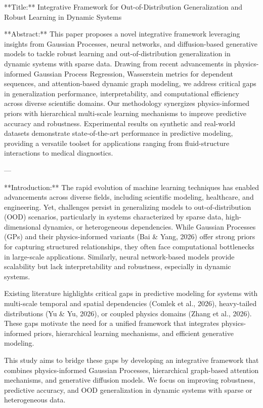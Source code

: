 **Title:**  
Integrative Framework for Out-of-Distribution Generalization and Robust Learning in Dynamic Systems  

**Abstract:**  
This paper proposes a novel integrative framework leveraging insights from Gaussian Processes, neural networks, and diffusion-based generative models to tackle robust learning and out-of-distribution generalization in dynamic systems with sparse data. Drawing from recent advancements in physics-informed Gaussian Process Regression, Wasserstein metrics for dependent sequences, and attention-based dynamic graph modeling, we address critical gaps in generalization performance, interpretability, and computational efficiency across diverse scientific domains. Our methodology synergizes physics-informed priors with hierarchical multi-scale learning mechanisms to improve predictive accuracy and robustness. Experimental results on synthetic and real-world datasets demonstrate state-of-the-art performance in predictive modeling, providing a versatile toolset for applications ranging from fluid-structure interactions to medical diagnostics.  

---

**Introduction:**  
The rapid evolution of machine learning techniques has enabled advancements across diverse fields, including scientific modeling, healthcare, and engineering. Yet, challenges persist in generalizing models to out-of-distribution (OOD) scenarios, particularly in systems characterized by sparse data, high-dimensional dynamics, or heterogeneous dependencies. While Gaussian Processes (GPs) and their physics-informed variants (Bai & Yang, 2026) offer strong priors for capturing structured relationships, they often face computational bottlenecks in large-scale applications. Similarly, neural network-based models provide scalability but lack interpretability and robustness, especially in dynamic systems.

Existing literature highlights critical gaps in predictive modeling for systems with multi-scale temporal and spatial dependencies (Comlek et al., 2026), heavy-tailed distributions (Yu & Yu, 2026), or coupled physics domains (Zhang et al., 2026). These gaps motivate the need for a unified framework that integrates physics-informed priors, hierarchical learning mechanisms, and efficient generative modeling.

This study aims to bridge these gaps by developing an integrative framework that combines physics-informed Gaussian Processes, hierarchical graph-based attention mechanisms, and generative diffusion models. We focus on improving robustness, predictive accuracy, and OOD generalization in dynamic systems with sparse or heterogeneous data.

